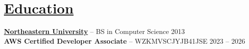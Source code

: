 \documentclass[10pt,letterpaper]{article}
\begin{document}
\vspace{-18.5pt}


\section*{\href{https://www.reddit.com/r/EngineeringResumes/wiki/index\#wiki_education}{Education}}
\textbf{\href{https://www.northeastern.edu/}{Northeastern University}} -- BS in Computer Science \hfill 2013 \\
\textbf{AWS Certified Developer Associate} -- WZKMVSCJYJB41JSE \hfill 2023 -- 2026

\end{document}
